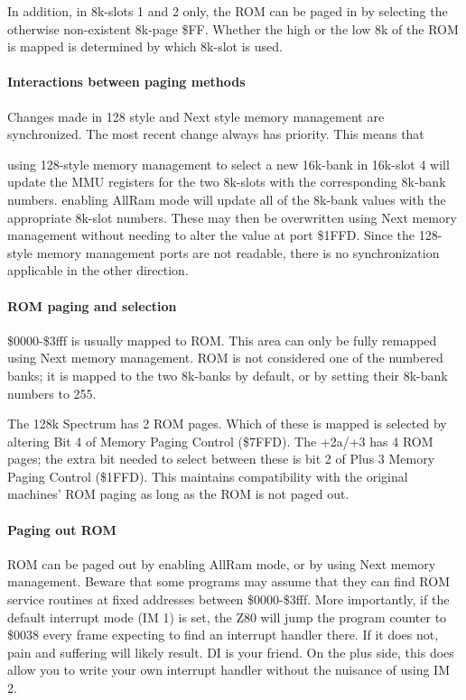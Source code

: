 In addition, in 8k-slots 1 and 2 only, the ROM can be paged in by
selecting the otherwise non-existent 8k-page \$FF. Whether the high or
the low 8k of the ROM is mapped is determined by which 8k-slot is
used.

\paragraph{Interactions between paging methods}
Changes made in 128 style and Next style memory management are
synchronized. The most recent change always has priority. This means
that

using 128-style memory management to select a new 16k-bank in 16k-slot
4 will update the MMU registers for the two 8k-slots with the
corresponding 8k-bank numbers.  enabling AllRam mode will update all
of the 8k-bank values with the appropriate 8k-slot numbers. These may
then be overwritten using Next memory management without needing to
alter the value at port \$1FFD.  Since the 128-style memory management
ports are not readable, there is no synchronization applicable in the
other direction.

\paragraph{ROM paging and selection}
\$0000-\$3fff is usually mapped to ROM. This area can only be fully
remapped using Next memory management. ROM is not considered one of
the numbered banks; it is mapped to the two 8k-banks by default, or by
setting their 8k-bank numbers to 255.

The 128k Spectrum has 2 ROM pages. Which of these is mapped is
selected by altering Bit 4 of Memory Paging Control (\$7FFD). The
+2a/+3 has 4 ROM pages; the extra bit needed to select between these
is bit 2 of Plus 3 Memory Paging Control (\$1FFD). This maintains
compatibility with the original machines' ROM paging as long as the
ROM is not paged out.

\paragraph{Paging out ROM}
ROM can be paged out by enabling AllRam mode, or by using Next memory
management. Beware that some programs may assume that they can find
ROM service routines at fixed addresses between \$0000-\$3fff. More
importantly, if the default interrupt mode (IM 1) is set, the Z80 will
jump the program counter to \$0038 every frame expecting to find an
interrupt handler there. If it does not, pain and suffering will
likely result. DI is your friend. On the plus side, this does allow
you to write your own interrupt handler without the nuisance of using
IM 2.

